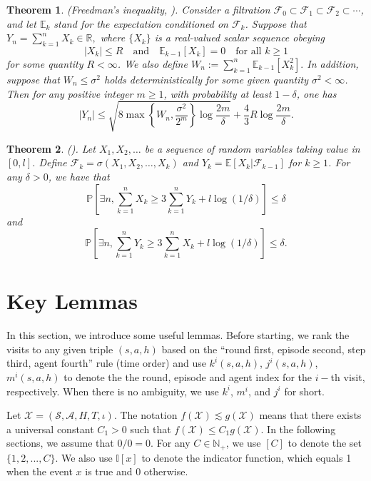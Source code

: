 \documentclass{article}
\newtheorem{theorem}{Theorem}[section]
\begin{document}
\begin{theorem}
\label{Freedman}
\textnormal{(Freedman's inequality, \cite[Theorem EC.1]{li2024q}).} Consider a filtration \( \mathcal{F}_0 \subset \mathcal{F}_1 \subset \mathcal{F}_2 \subset \cdots \), and let \( \mathbb{E}_k \) stand for the expectation conditioned on \( \mathcal{F}_k \). Suppose that $Y_n = \sum_{k=1}^n X_k \in \mathbb{R},$ where \( \{X_k\} \) is a real-valued scalar sequence obeying
\[
|X_k| \leq R \quad \text{and} \quad \mathbb{E}_{k-1}[X_k] = 0 \quad \text{for all } k \geq 1
\]
for some quantity \( R < \infty \). We also define
$W_n := \sum_{k=1}^n \mathbb{E}_{k-1}[X_k^2].$ In addition, suppose that \( W_n \leq \sigma^2 \) holds deterministically for some given quantity \( \sigma^2 < \infty \). Then for any positive integer \( m \geq 1 \), with probability at least \( 1 - \delta \), one has
\[
|Y_n| \leq \sqrt{8 \max \left\{ W_n, \frac{\sigma^2}{2^m} \right\} \log \frac{2m}{\delta} } + \frac{4}{3} R \log \frac{2m}{\delta}.
\]
\end{theorem}

\begin{theorem}
\label{1-P}
     \textnormal{(\cite[Lemma 10]{zhang2022horizon}).} Let $X_1, X_2, \dots$ be a sequence of random variables taking value in $[0, l]$. Define $\mathcal{F}_k = \sigma(X_1, X_2, \dots, X_{k})$ and $Y_k = \mathbb{E}[X_k|\mathcal{F}_{k-1}]$ for $k \geq 1$. For any $\delta > 0$, we have that
    \[\mathbb{P} \left[ \exists n, \sum_{k=1}^{n} X_k \geq 3 \sum_{k=1}^{n} Y_k + l \log(1/\delta) \right] \leq \delta\]
    and
    \[\mathbb{P} \left[ \exists n, \sum_{k=1}^{n} Y_k \geq 3 \sum_{k=1}^{n} X_k + l \log(1/\delta) \right] \leq \delta.\]
\end{theorem}

\section{Key Lemmas}
\label{key}
In this section, we introduce some useful lemmas. Before starting, we rank the visits to any given triple $(s,a,h)$ based on the ``round first, episode second, step third, agent fourth” rule (time order) and use $k^i(s,a,h)$, $j^i(s,a,h)$, $m^i(s,a,h)$ to denote the the round, episode and agent index for the $i-$th visit, respectively. When there is no ambiguity, we use $k^i$, $m^i$, and $j^i$ for short. 

Let $\mathcal{X} = (\mathcal{S},\mathcal{A},H,T,\iota)$. The notation $f(\mathcal{X}) \lesssim g(\mathcal{X})$ means that there exists a universal constant $C_1>0$ such that  $f(\mathcal{X})\leq C_1g(\mathcal{X})$. In the following sections, we assume that $0/0 = 0$. For any $C \in \mathbb{N}_+$, we use $[C]$ to denote the set $\{1,2,...,C\}$. We also use $\mathbb{I}[x]$ to denote the indicator function, which equals 1 when the event $x$ is true and 0 otherwise.
\end{document}
